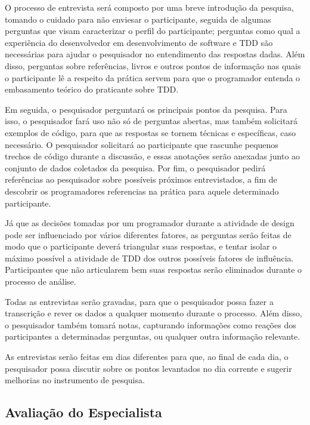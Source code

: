 O processo de entrevista será composto por uma breve introdução da pesquisa, tomando
o cuidado para não enviesar o participante, seguida de algumas perguntas que visam
caracterizar o perfil do participante; perguntas como qual a experiência do
desenvolvedor em desenvolvimento de software e TDD são necessárias para ajudar o
pesquisador no entendimento das respostas dadas. Além disso, perguntas sobre
referências, livros e outros pontos de informação nas quais o participante lê a
respeito da prática servem para que o programador entenda o embasamento teórico
do praticante sobre TDD.

Em seguida, o pesquisador perguntará os principais pontos da pesquisa.
Para isso, o pesquisador fará uso não só de perguntas abertas, mas também
solicitará exemplos de código, para que as respostas se tornem técnicas e
específicas, caso necessário. O pesquisador solicitará ao participante que rascunhe pequenos
trechos de código durante a discussão, e essas anotações serão anexadas junto ao
conjunto de dados coletados da pesquisa.
Por fim, o pesquisador pedirá referências ao pesquisador sobre
possíveis próximos entrevistados, a fim de descobrir os programadores referencias 
na prática para aquele determinado participante.

Já que as decisões tomadas por um programador durante a atividade de design
pode ser influenciado por vários diferentes fatores, 
as perguntas serão feitas de modo que o participante deverá triangular suas respostas,
e tentar isolar o máximo possível a atividade de TDD dos outros possíveis fatores
de influência. Participantes que não articularem bem suas respostas serão eliminados
durante o processo de análise.

Todas as entrevistas serão gravadas, para que o pesquisador possa fazer a
transcrição e rever os dados a qualquer momento durante o processo. Além disso,
o pesquisador também tomará notas, capturando informações como reações dos 
participantes a determinadas perguntas, ou qualquer outra informação relevante. 

As entrevistas serão feitas em dias diferentes para que, ao final
de cada dia, o pesquisador possa discutir sobre os pontos levantados no dia
corrente e sugerir melhorias no instrumento de pesquisa. 

\subsection{Avaliação do Especialista}
\label{sec:planejamento-especialista}

